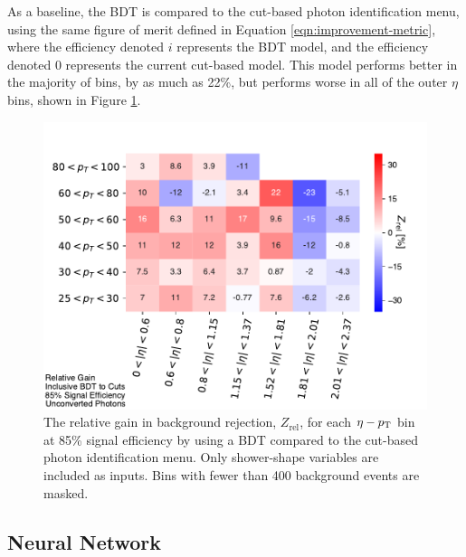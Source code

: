 As a baseline, the \gls{BDT} is compared to the cut-based photon identification menu, using the same figure of merit defined in Equation \ref{eqn:improvement-metric}, where the efficiency denoted $i$ represents the \gls{BDT} model, and the efficiency denoted $0$ represents the current cut-based model. This model performs better in the majority of bins, by as much as 22\%, but performs worse in all of the outer $\eta$ bins, shown in Figure \ref{fig:gain-bdt-vs-cuts}.
\begin{figure}[!htb]
    \centering
    \includegraphics[width=.85\textwidth]{chapters/chapter4_photonID/images/gain_BDTinclusive_cuts_unconverted.pdf}
    \caption[The relative gain in background rejection, $Z_{\text{rel}}$, for each $\eta-\pt$ bin at 85\% signal efficiency by using a \gls{BDT} compared to the cut-based photon identification menu]
    {The relative gain in background rejection, $Z_{\text{rel}}$, for each $\eta-\pt$ bin at 85\% signal efficiency by using a \gls{BDT} compared to the cut-based photon identification menu. Only shower-shape variables are included as inputs. Bins with fewer than 400 background events are masked.}
    \label{fig:gain-bdt-vs-cuts}
\end{figure}


\subsection{Neural Network}\label{ssec:yid-nn}

